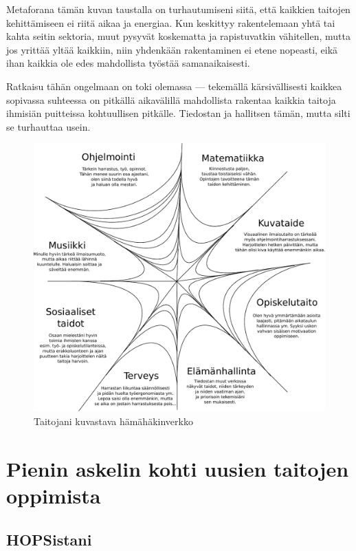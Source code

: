 \documentclass[utf8]{gradu3}
\begin{document}
Metaforana tämän kuvan taustalla on turhautumiseni siitä, että kaikkien
taitojen kehittämiseen ei riitä aikaa ja energiaa. Kun keskittyy
rakentelemaan yhtä tai kahta seitin sektoria, muut pysyvät koskematta ja
rapistuvatkin vähitellen, mutta jos yrittää yltää kaikkiin, niin yhdenkään
rakentaminen ei etene nopeasti, eikä ihan kaikkia ole edes mahdollista
työstää samanaikaisesti.

Ratkaisu tähän ongelmaan on toki olemassa — tekemällä kärsivällisesti kaikkea
sopivassa suhteessa on pitkällä aikavälillä mahdollista rakentaa kaikkia
taitoja ihmisiän puitteissa kohtuullisen pitkälle. Tiedostan ja hallitsen
tämän, mutta silti se turhauttaa usein.

\begin{figure}[tp]
  \centering
  \includegraphics[width=\textwidth]{meitsi}
  \caption{\label{verkko}Taitojani kuvastava hämähäkinverkko}
\end{figure}

\chapter{Pienin askelin kohti uusien taitojen oppimista}
\label{hopsJaGradu}

\section{HOPSistani}
\end{document}
